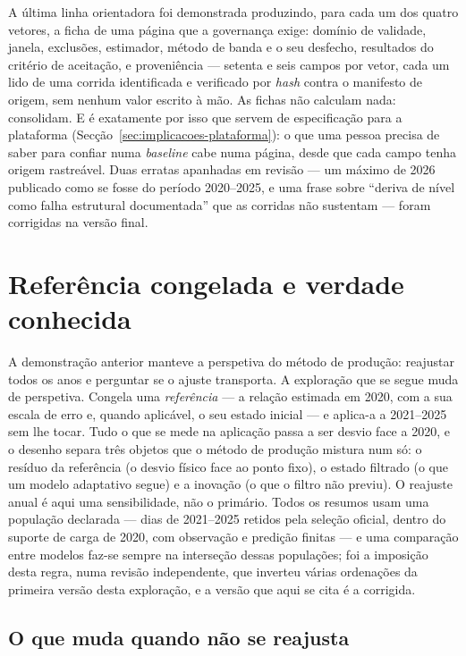 A última linha orientadora foi demonstrada produzindo, para cada um dos
quatro vetores, a ficha de uma página que a governança exige: domínio de
validade, janela, exclusões, estimador, método de banda e o seu desfecho,
resultados do critério de aceitação, e proveniência --- setenta e seis
campos por vetor, cada um lido de uma corrida identificada e verificado por
\emph{hash} contra o manifesto de origem, sem nenhum valor escrito à mão. As
fichas não calculam nada: consolidam. E é exatamente por isso que servem de
especificação para a plataforma (Secção~\ref{sec:implicacoes-plataforma}): o
que uma pessoa precisa de saber para confiar numa \emph{baseline} cabe numa
página, desde que cada campo tenha origem rastreável. Duas erratas
apanhadas em revisão --- um máximo de 2026 publicado como se fosse do
período 2020--2025, e uma frase sobre ``deriva de nível como falha estrutural
documentada'' que as corridas não sustentam --- foram corrigidas na versão
final.

\section{Referência congelada e verdade conhecida}
\label{sec:referencia-congelada}

A demonstração anterior manteve a perspetiva do método de produção:
reajustar todos os anos e perguntar se o ajuste transporta. A exploração
que se segue muda de perspetiva. Congela uma \emph{referência} --- a relação
estimada em 2020, com a sua escala de erro e, quando aplicável, o seu estado
inicial --- e aplica-a a 2021--2025 sem lhe tocar. Tudo o que se mede na
aplicação passa a ser desvio face a 2020, e o desenho separa três objetos
que o método de produção mistura num só: o resíduo da referência (o desvio
físico face ao ponto fixo), o estado filtrado (o que um modelo adaptativo
segue) e a inovação (o que o filtro não previu). O reajuste anual é aqui
uma sensibilidade, não o primário. Todos os resumos usam uma população
declarada --- dias de 2021--2025 retidos pela seleção oficial, dentro do
suporte de carga de 2020, com observação e predição finitas --- e uma
comparação entre modelos faz-se sempre na interseção dessas populações; foi
a imposição desta regra, numa revisão independente, que inverteu várias
ordenações da primeira versão desta exploração, e a versão que aqui se cita
é a corrigida.

\subsection{O que muda quando não se reajusta}
\label{sec:referencia-fixa}

